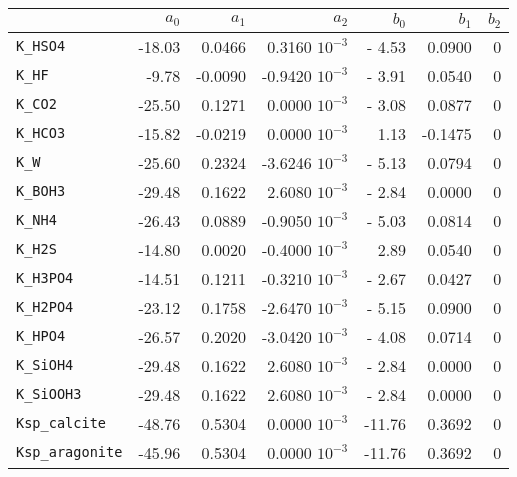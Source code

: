 \documentclass[a4paper]{article}
\begin{document}
\begin{center}
\begin{tabular}{|lrrrrrr|}\hline
              & $a_0$ & $a_1$ & $a_2$ & $b_0$ & $b_1$ & $b_2$\\ \hline
\texttt{K\_HSO4}        & -18.03& 0.0466& 0.3160 $10^{-3}$&- 4.53& 0.0900&0\\
\texttt{K\_HF}          &  -9.78&-0.0090&-0.9420 $10^{-3}$&- 3.91& 0.0540&0\\
\texttt{K\_CO2}         & -25.50& 0.1271& 0.0000 $10^{-3}$&- 3.08& 0.0877&0\\
\texttt{K\_HCO3}        & -15.82&-0.0219& 0.0000 $10^{-3}$&  1.13&-0.1475&0\\
\texttt{K\_W}           & -25.60& 0.2324&-3.6246 $10^{-3}$&- 5.13& 0.0794&0\\
\texttt{K\_BOH3}        & -29.48& 0.1622& 2.6080 $10^{-3}$&- 2.84& 0.0000&0\\
\texttt{K\_NH4}         & -26.43& 0.0889&-0.9050 $10^{-3}$&- 5.03& 0.0814&0\\
\texttt{K\_H2S}         & -14.80& 0.0020&-0.4000 $10^{-3}$&  2.89& 0.0540&0\\
\texttt{K\_H3PO4}       & -14.51& 0.1211&-0.3210 $10^{-3}$&- 2.67& 0.0427&0\\
\texttt{K\_H2PO4}       & -23.12& 0.1758&-2.6470 $10^{-3}$&- 5.15& 0.0900&0\\
\texttt{K\_HPO4}        & -26.57& 0.2020&-3.0420 $10^{-3}$&- 4.08& 0.0714&0\\
\texttt{K\_SiOH4}       & -29.48& 0.1622& 2.6080 $10^{-3}$&- 2.84& 0.0000&0\\
\texttt{K\_SiOOH3}      & -29.48& 0.1622& 2.6080 $10^{-3}$&- 2.84& 0.0000&0\\
\texttt{Ksp\_calcite}   & -48.76& 0.5304& 0.0000 $10^{-3}$&-11.76& 0.3692&0\\
\texttt{Ksp\_aragonite} & -45.96& 0.5304& 0.0000 $10^{-3}$&-11.76& 0.3692&0\\ \hline
\end{tabular}
\end{center}
\end{document}
